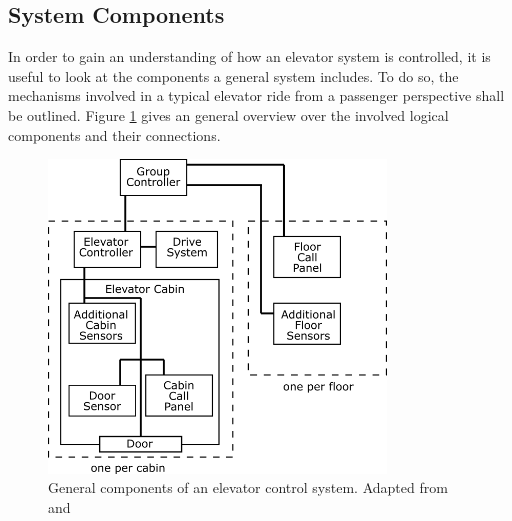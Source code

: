 \subsection{System Components}

In order to gain an understanding of how an elevator system is controlled,
it is useful to look at the components a general system includes.
To do so, the mechanisms involved in a typical elevator ride 
from a passenger perspective shall be outlined.
Figure \ref{fig:sota:systemcomponents} gives an general overview over the involved logical components and their connections.

\begin{figure}[hbt]
	\centering
	\includegraphics[width=0.8\textwidth, keepaspectratio]{resources/systemcomponets}
	\caption[General components of an elevator control system]{\label{fig:sota:systemcomponents} General components of an elevator control system. Adapted from \textcite[][pp.~4,16]{xang2016trafficlist} and  \textcite[][p.~10]{siikonen1997models}}
\end{figure}

